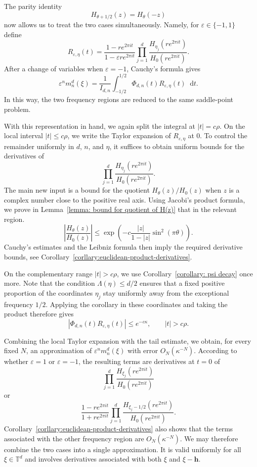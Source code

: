 \documentclass{article}
\newcommand{\dd}{\mathop{}\!\mathrm{d}}
\theoremstyle{plain}
\numberwithin{equation}{section}
\begin{document}
The parity identity
\[
H_{\theta+1/2}(z)=H_\theta(-z)
\]
now allows us to treat the two cases simultaneously. Namely, for $\varepsilon\in\{-1,1\}$ define
\[
R_{\varepsilon,\eta}(t)
=
\frac{1-re^{2\pi it}}
     {1-\varepsilon re^{2\pi it}}
\prod_{j=1}^d
\frac{H_{\eta_j}(re^{2\pi it})}
     {H_0(re^{2\pi it})}.
\]
After a change of variables when \(\varepsilon=-1\), Cauchy's formula
gives
\[
\varepsilon^n m_n^d(\xi)
=
\frac{1}{I_{d,n}}
\int_{-1/2}^{1/2}
\Phi_{d,n}(t)R_{\varepsilon,\eta}(t)\dd t.
\]
In this way, the two frequency regions are reduced to the same
saddle-point problem.

With this representation in hand, we again split the integral at
\(|t|=c\rho\). On the local interval \(|t|\le c\rho\), we write the Taylor expansion of
\(R_{\varepsilon,\eta}\) at \(0\). To control the remainder uniformly
in \(d\), \(n\), and \(\eta\), it suffices to obtain uniform bounds for
the derivatives of
\[
\prod_{j=1}^d
\frac{H_{\eta_j}(re^{2\pi it})}
     {H_0(re^{2\pi it})}.
\]
The main new input is a bound for the quotient \(H_\theta(z)/H_0(z)\) when \(z\) is a
complex number close to the positive real axis. Using Jacobi's product
formula, we prove in Lemma~\ref{lemma: bound for quotient of H(z)}
that in the relevant region.
\[
\left|
\frac{H_\theta(z)}{H_0(z)}
\right|
\leq
\exp\left(
-c\frac{|z|}{1-|z|}
\sin^2(\pi\theta)
\right).
\]
Cauchy's estimates and the Leibniz formula
then imply the required derivative bounds, see
Corollary~\ref{corllary:euclidean-product-derivatives}.

On the complementary range \(|t|>c\rho\), we use
Corollary~\ref{corollary: psi decay} once more. Note that the condition
\(\Lambda(\eta)\leq d/2\) ensures that a fixed positive proportion of
the coordinates \(\eta_j\) stay uniformly away from the exceptional
frequency \(1/2\). Applying the corollary in these coordinates and
taking the product therefore gives
\[
|\Phi_{d,n}(t)R_{\varepsilon,\eta}(t)|
\leq e^{-c\kappa},
\qquad |t|>c\rho.
\]

Combining the local Taylor expansion with the tail estimate, we
obtain, for every fixed \(N\), an approximation of \(\varepsilon^n m_n^d(\xi)\) with error
\(O_N(\kappa^{-N})\). According to whether
\(\varepsilon=1\) or \(\varepsilon=-1\), the resulting terms are
derivatives at \(t=0\) of
\[
\prod_{j=1}^d
\frac{H_{\xi_j}(re^{2\pi it})}
     {H_0(re^{2\pi it})}
\]
or
\[
\frac{1-re^{2\pi it}}{1+re^{2\pi it}}
\prod_{j=1}^d
\frac{H_{\xi_j-1/2}(re^{2\pi it})}
     {H_0(re^{2\pi it})}.
\]
Corollary~\ref{corllary:euclidean-product-derivatives} also shows that
the terms associated with the other frequency region are
\(O_N(\kappa^{-N})\). We may therefore combine the two cases into a
single approximation. It is valid uniformly for all
\(\xi\in\mathbb T^d\) and involves derivatives associated with both
\(\xi\) and \(\xi-\mathbf h\).
\end{document}
